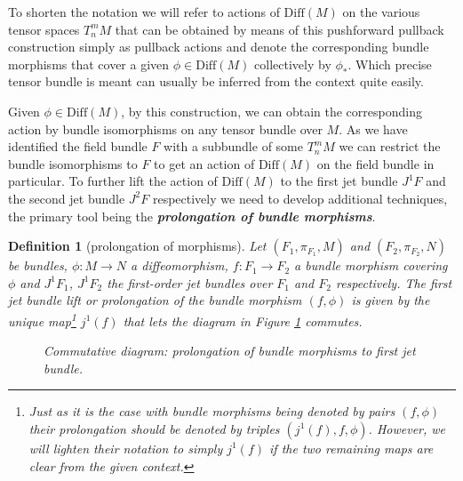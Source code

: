 \documentclass[a4paper,12pt, DIV=14, BCOR=5mm, twoside, headsepline, numbers=noenddot]{scrbook}
\newtheorem{definition}{Definition}[section]
\begin{document}
To shorten the notation we will refer to actions of $\mathrm{Diff}(M)$ on the various tensor spaces $T^m_nM$ that can be obtained by means of this pushforward pullback construction simply as pullback actions and denote the corresponding bundle morphisms that cover a given $\phi \in \mathrm{Diff}(M)$ collectively by $\phi_{\ast}$. Which precise tensor bundle is meant can usually be inferred from the context quite easily.

Given $\phi \in \mathrm{Diff}(M)$, by this construction, we can obtain the corresponding action by bundle isomorphisms on any tensor bundle over $M$. As we have identified the field bundle $F$ with a subbundle of some $T^m_nM$ we can restrict the bundle isomorphisms to $F$ to get an action of $\mathrm{Diff}(M)$ on the field bundle in particular. 
To further lift the action of $\mathrm{Diff}(M)$ to the first jet bundle $J^1F$ and the second jet bundle $J^2F$ respectively we need to develop additional techniques, the primary tool being the \textbf{\textit{prolongation of bundle morphisms}}. 
\begin{definition}[prolongation of morphisms]
Let $(F_1,\pi_{F_1},M)$ and $(F_2,\pi_{F_2},N)$ be bundles, $\phi : M \rightarrow N$ a diffeomorphism, $f : F_1 \rightarrow F_2$ a bundle morphism covering $\phi$ and $J^1F_1$, $J^1F_2$ the first-order jet bundles over $F_1$ and $F_2$ respectively. The first jet bundle lift or prolongation of the bundle morphism $(f,\phi)$ is given by the unique map\footnote{Just as it is the case with bundle morphisms being denoted by pairs $(f,\phi)$ their prolongation should be denoted by triples $(j^1(f),f,\phi)$. However, we will lighten their notation to simply $j^1(f)$ if the two remaining maps are clear from the given context.} $j^1(f)$ that lets the diagram in Figure \ref{ProlongMorph} commutes.
\begin{figure}[hbt!]
\centering
{}
\caption{Commutative diagram: prolongation of bundle morphisms to first jet bundle.}\label{ProlongMorph}
\end{figure}
\end{definition}
\end{document}
